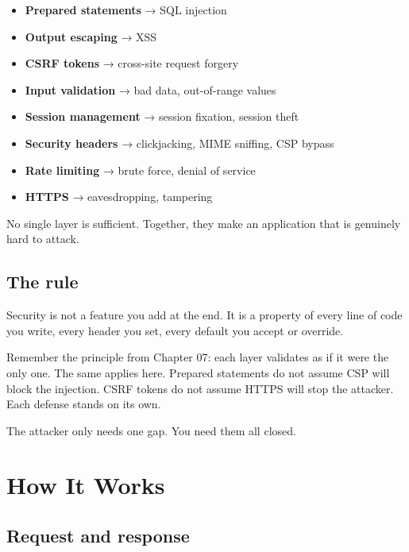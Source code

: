 \documentclass[11pt,a4paper,oneside]{book}
\providecommand{\tightlist}{%
  \setlength{\itemsep}{0pt}\setlength{\parskip}{0pt}}
\begin{document}
\begin{itemize}
\tightlist
\item
  \textbf{Prepared statements} → SQL injection
\item
  \textbf{Output escaping} → XSS
\item
  \textbf{CSRF tokens} → cross-site request forgery
\item
  \textbf{Input validation} → bad data, out-of-range values
\item
  \textbf{Session management} → session fixation, session theft
\item
  \textbf{Security headers} → clickjacking, MIME sniffing, CSP
  bypass
\item
  \textbf{Rate limiting} → brute force, denial of service
\item
  \textbf{HTTPS} → eavesdropping, tampering
\end{itemize}

No single layer is sufficient. Together, they make an application
that is genuinely hard to attack.

\hypertarget{the-rule}{%
\section{The rule}\label{the-rule}}

Security is not a feature you add at the end. It is a property of
every line of code you write, every header you set, every default
you accept or override.

Remember the principle from Chapter 07: each layer validates as
if it were the only one. The same applies here. Prepared
statements do not assume CSP will block the injection. CSRF
tokens do not assume HTTPS will stop the attacker. Each defense
stands on its own.

The attacker only needs one gap. You need them all closed.

\newpage

\appendix

\hypertarget{how-it-works-1}{%
\chapter{How It Works}\label{how-it-works-1}}

\hypertarget{request-and-response}{%
\section{Request and response}\label{request-and-response}}
\end{document}
